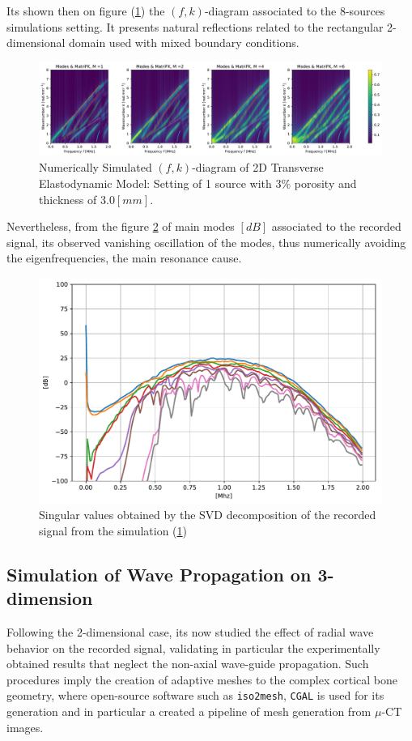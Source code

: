 Its shown then on figure (\ref{FK-DiagramFreqS8P12M28}) the $(f,k)$-diagram associated to the 8-sources simulations setting. It presents natural reflections related to the rectangular 2-dimensional domain used with mixed boundary conditions.
\begin{figure}[!h]
	\centering
	\includegraphics[width=\textwidth]{images/FreqMultSous/2DMixedP12TransIsoFKW28M400_y.pdf}
	\caption{Numerically Simulated $(f,k)$-diagram of 2D Transverse Elastodynamic Model: Setting of 1 source with $3\%$ porosity and thickness of $3.0 [mm]$.}
	\label{FK-DiagramFreqS8P12M28}
\end{figure}

Nevertheless, from the figure \ref{SVD-FreqS8P12M28} of main modes $[dB]$ associated to the recorded signal, its observed vanishing oscillation of the modes, thus numerically avoiding the eigenfrequencies, the main resonance cause.
\begin{figure}[!h]
	\centering
	\includegraphics[scale=.5]{images/FreqMultSous/2D-FreqSimP12W28eKV_SV.pdf}
	\caption{Singular values obtained by the SVD decomposition of the recorded signal from the simulation (\ref{FK-DiagramFreqS8P12M28})}
	\label{SVD-FreqS8P12M28}
\end{figure}


\subsection{Simulation of Wave Propagation on 3-dimension}
Following the 2-dimensional case, its now studied the effect of radial wave behavior on the recorded signal, validating in particular the experimentally obtained results that neglect the non-axial wave-guide propagation. 
Such procedures imply the creation of adaptive meshes to the complex cortical bone geometry, where open-source software such as \texttt{iso2mesh}, \texttt{CGAL} is used for its generation and in particular a created a pipeline of mesh generation from $\mu$-CT images.

